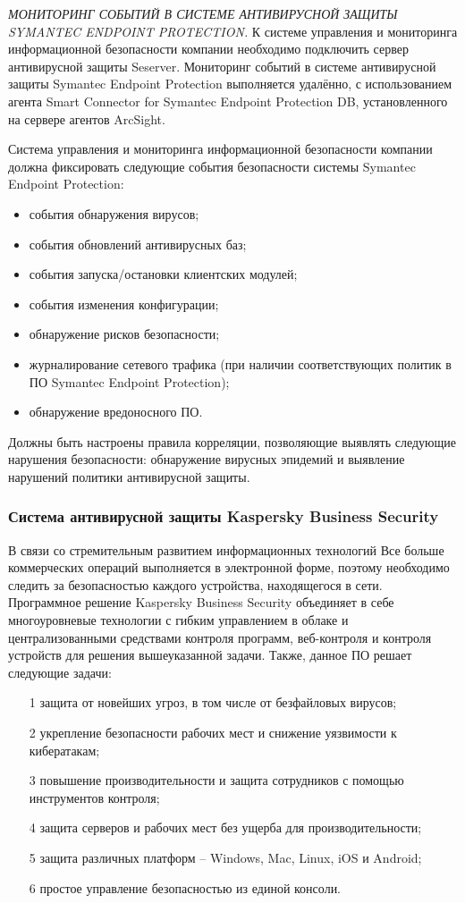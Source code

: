 \textit{МОНИТОРИНГ СОБЫТИЙ В СИСТЕМЕ АНТИВИРУСНОЙ ЗАЩИТЫ SYMANTEC ENDPOINT PROTECTION.}
К системе управления и мониторинга информационной безопасности компании необходимо подключить сервер антивирусной защиты Seserver. Мониторинг событий в системе антивирусной защиты Symantec Endpoint Protection выполняется удалённо, с использованием агента Smart Connector for Symantec Endpoint Protection DB, установленного на сервере агентов ArcSight.

Система управления и мониторинга информационной безопасности компании должна фиксировать следующие события безопасности системы Symantec Endpoint Protection:
\begin{itemize}
    \item события обнаружения вирусов;
    \item события обновлений антивирусных баз;
    \item события запуска/остановки клиентских модулей;
    \item события изменения конфигурации;
    \item обнаружение рисков безопасности;
    \item журналирование сетевого трафика (при наличии соответствующих политик в ПО Symantec Endpoint Protection);
    \item обнаружение вредоносного ПО.
\end{itemize}

Должны быть настроены правила корреляции, позволяющие выявлять следующие нарушения безопасности: обнаружение вирусных эпидемий и выявление нарушений политики антивирусной защиты.



\subsubsection{Система антивирусной защиты Kaspersky Business Security}
В связи со стремительным развитием информационных технологий Все больше коммерческих операций выполняется в электронной форме, поэтому необходимо следить за безопасностью каждого устройства, находящегося в сети. Программное решение Kaspersky Business Security объединяет в себе многоуровневые технологии с гибким управлением в облаке и централизованными средствами контроля программ, веб-контроля и контроля устройств для решения вышеуказанной задачи. Также, данное ПО решает следующие задачи:
\begin{itemize}
    \item[1] защита от новейших угроз, в том числе от безфайловых вирусов;
    \item[2] укрепление безопасности рабочих мест и снижение уязвимости к кибератакам;
    \item[3] повышение производительности и защита сотрудников с помощью инструментов контроля;
    \item[4] защита серверов и рабочих мест без ущерба для производительности;
    \item[5] защита различных платформ – Windows, Mac, Linux, iOS и Android;
    \item[6] простое управление безопасностью из единой консоли.
\end{itemize}

